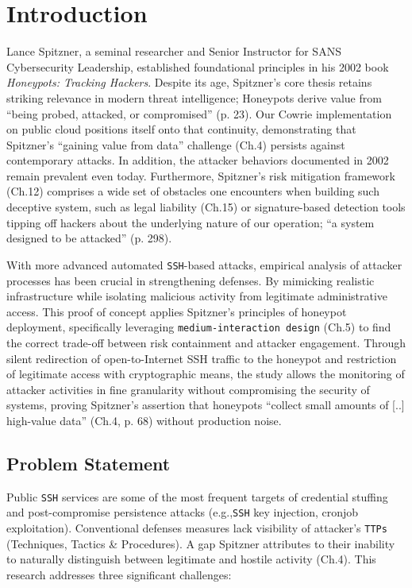 \documentclass{cls/ULBreport}
\begin{document}
    \section{Introduction}

    Lance Spitzner, a seminal researcher and Senior Instructor for SANS Cybersecurity Leadership, established foundational principles in his 2002 book \textit{Honeypots: Tracking Hackers}. 
    Despite its age, Spitzner's core thesis retains striking relevance in modern threat intelligence; Honeypots derive value from \enquote{being probed, attacked, or compromised} (p. 23). Our Cowrie implementation on public cloud positions itself onto that continuity, demonstrating that Spitzner's \enquote{gaining value from data} challenge (Ch.4) persists against contemporary attacks. In addition, the attacker behaviors documented in 2002 remain prevalent even today. Furthermore, Spitzner's risk mitigation framework (Ch.12) comprises a wide set of obstacles one encounters when building such deceptive system, such as legal liability (Ch.15) or signature-based detection tools tipping off hackers about the underlying nature of our operation; \enquote{a system designed to be attacked} (p. 298). 
    
    
    With more advanced automated \texttt{SSH}-based attacks, empirical analysis of attacker processes has been crucial in strengthening defenses. By mimicking realistic infrastructure while isolating malicious activity from legitimate administrative access. This proof of concept applies Spitzner's principles of honeypot deployment, specifically leveraging \texttt{medium-interaction design} (Ch.5) to find the correct trade-off between risk containment and attacker engagement. Through silent redirection of open-to-Internet SSH traffic to the honeypot and restriction of legitimate access with cryptographic means, the study allows the monitoring of attacker activities in fine granularity without compromising the security of systems, proving Spitzner's assertion that honeypots \enquote{collect small amounts of [..] high-value data} (Ch.4, p. 68) without production noise.  

        \subsection{Problem Statement} 
        Public \texttt{SSH} services are some of the most frequent targets of credential stuffing and post-compromise persistence attacks (e.g.,\texttt{SSH} key injection, cronjob exploitation). Conventional defenses measures lack visibility of attacker's \texttt{TTPs} (Techniques, Tactics \& Procedures). A gap Spitzner attributes to their inability to naturally distinguish between legitimate and hostile activity (Ch.4). This research addresses three significant challenges: 
            
\end{document}

